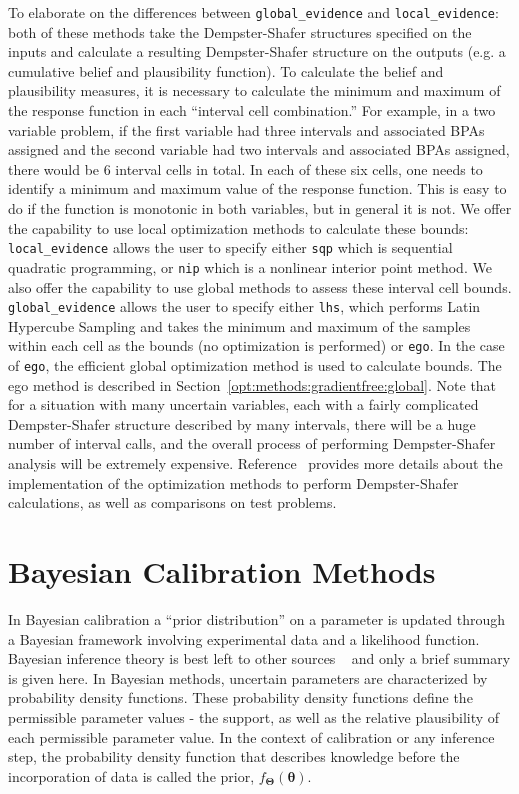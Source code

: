 To elaborate on the differences between \texttt{global\_evidence} and
\texttt{local\_evidence}: both of these methods take the
Dempster-Shafer structures specified on the inputs and calculate a
resulting Dempster-Shafer structure on the outputs (e.g. a cumulative
belief and plausibility function).  To calculate the belief and
plausibility measures, it is necessary to calculate the minimum and
maximum of the response function in each ``interval cell
combination.''  For example, in a two variable problem, if the first
variable had three intervals and associated BPAs assigned and the
second variable had two intervals and associated BPAs assigned, there
would be 6 interval cells in total.  In each of these six cells, one
needs to identify a minimum and maximum value of the response
function. This is easy to do if the function is monotonic in both
variables, but in general it is not. We offer the capability to use
local optimization methods to calculate these bounds:
\texttt{local\_evidence} allows the user to specify either
\texttt{sqp} which is sequential quadratic programming, or
\texttt{nip} which is a nonlinear interior point method. We also offer
the capability to use global methods to assess these interval cell
bounds. \texttt{global\_evidence} allows the user to specify either
\texttt{lhs}, which performs Latin Hypercube Sampling and takes the
minimum and maximum of the samples within each cell as the bounds (no
optimization is performed) or \texttt{ego}. In the case of
\texttt{ego}, the efficient global optimization method is used to
calculate bounds. The ego method is described in
Section~\ref{opt:methods:gradientfree:global}.  Note that for a
situation with many uncertain variables, each with a fairly
complicated Dempster-Shafer structure described by many intervals,
there will be a huge number of interval calls, and the overall process
of performing Dempster-Shafer analysis will be extremely expensive.
Reference~\cite{Tang10b} provides more details about the
implementation of the optimization methods to perform Dempster-Shafer
calculations, as well as comparisons on test problems.

\section{Bayesian Calibration Methods}\label{uq:bayesian}

In Bayesian calibration a ``prior distribution'' on a parameter is
updated through a Bayesian framework involving experimental data and a
likelihood function.  Bayesian inference theory is best left to other
sources ~\cite{Kenn01} and only a brief summary is given here.  In
Bayesian methods, uncertain parameters are characterized by
probability density functions. These probability density functions
define the permissible parameter values - the support, as well as the
relative plausibility of each permissible parameter value. In the
context of calibration or any inference step, the probability density
function that describes knowledge before the incorporation of data is
called the prior, $f_{\boldsymbol{\Theta}}\left( \boldsymbol{\theta}
\right)$.
 
